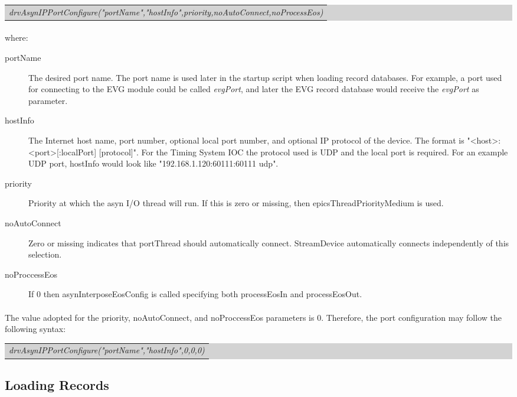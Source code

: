 \documentclass[openany]{article}
\begin{document}
		\bigskip
		\colorbox{lightgray}{
			\begin{tabularx}{0.9\textwidth}{X}
			\emph{drvAsynIPPortConfigure("portName","hostInfo",priority,noAutoConnect,noProcessEos)}
			\end{tabularx}
		}

		\paragraph{} where:
		\begin{description}
		\item [portName] The desired port name. The port name is used later in the startup script when loading record databases. For example, a port used for connecting to the EVG module could be called \emph{evgPort}, and later the EVG record database would receive the \emph{evgPort} as parameter.
		\item [hostInfo] The Internet host name, port number, optional local port number, and optional IP protocol of
the device. The format is "\textless host\textgreater:\textless port\textgreater[:localPort] [protocol]". For the Timing System IOC the protocol used is UDP and the local port is required. For an example UDP port, hostInfo would look like "192.168.1.120:60111:60111 udp".
		\item [priority] Priority at which the asyn I/O thread will run. If this is zero or missing, then epicsThreadPriorityMedium is used.
		\item [noAutoConnect] Zero or missing indicates that portThread should automatically connect. StreamDevice automatically connects independently of this selection.
		\item [noProccessEos] If 0 then asynInterposeEosConfig is called specifying both processEosIn and processEosOut.
		\end{description}

		\paragraph{} The value adopted for the priority, noAutoConnect, and noProccessEos parameters is 0. Therefore, the port configuration may follow the following syntax:

		\bigskip
		\colorbox{lightgray}{
			\begin{tabularx}{0.9\textwidth}{X}
			\emph{drvAsynIPPortConfigure("portName","hostInfo",0,0,0)}
			\end{tabularx}
		}

	\subsection{Loading Records}
\end{document}
